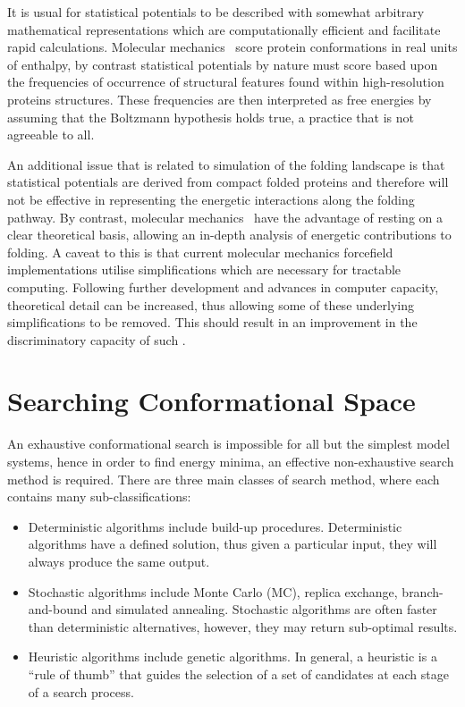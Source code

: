 It is usual for statistical potentials to be described with somewhat arbitrary
mathematical representations which are computationally efficient and facilitate rapid calculations. Molecular mechanics \forcefields\ score protein
conformations in real units of enthalpy, by contrast statistical potentials
by nature must score based upon the frequencies of occurrence of structural
features found within high-resolution proteins structures. These frequencies
are then interpreted as free energies by assuming that the Boltzmann hypothesis\cite{FORCEFIELD:Shortle2003}
holds true, a practice that is not agreeable to all\cite{FORCEFIELD:REVIEW:KNOWLEDGEBASED}. 

An additional issue
that is related to simulation of the folding landscape is that  statistical
potentials are derived from compact folded proteins and therefore will
not be effective in representing the energetic interactions along the folding
pathway. By contrast, molecular mechanics \forcefields\ have the advantage of resting on a clear theoretical basis, allowing an in-depth analysis of energetic contributions to folding. A caveat to this is that current molecular mechanics
forcefield implementations utilise simplifications which are  necessary for tractable computing. Following further development and advances
in computer capacity, theoretical detail can be increased, thus allowing some
of these underlying simplifications to be removed. This should result in an improvement
in the discriminatory capacity of such \forcefields. 





\section{Searching Conformational Space}
\label{section:protmodel:conformational_search}

An exhaustive conformational search is impossible for all but the simplest model systems, hence
in order to find energy minima, an effective non-exhaustive search method is  required.
There are three main classes of search method, where each contains many sub-classifications:

\begin{itemize} \isep
\item 
Deterministic algorithms include build-up procedures.
Deterministic algorithms have a defined solution, thus given a particular input, they will always produce the same output.
\item
Stochastic algorithms include Monte Carlo (MC), replica
exchange, branch-and-bound and simulated
annealing. Stochastic algorithms are often faster than deterministic alternatives, however, they may return sub-optimal results.
\item
Heuristic algorithms include genetic algorithms. In general, a heuristic is a ``rule of thumb'' that guides the selection of a set of candidates at each stage of a search process. \\[-0.9cm]
\end{itemize}

